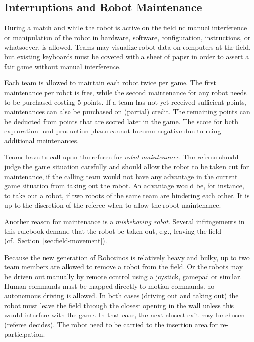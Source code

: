 \documentclass[12pt,twoside]{article}
\newcommand{\refsec}[1]{Section~\ref{#1}}
\begin{document}
\subsection{Interruptions and Robot Maintenance}
\label{sec:robot-maintenance}
During a match and while the robot is active on the field no manual
interference or manipulation of the robot in hardware, software,
configuration, instructions, or whatsoever, is allowed.  Teams may
visualize robot data on computers at the field, but existing keyboards
must be covered with a sheet of paper in order to assert a fair game
without manual interference.


Each team is allowed to maintain each robot twice per game. The first
maintenance per robot is free, while the second maintenance for any
robot needs to be purchased costing 5 points. If a team has not yet
received sufficient points, maintenances can also be purchased on
(partial) credit. The remaining points can be deducted from points
that are scored later in the game. The score for both exploration-
and production-phase cannot become negative due to using additional
maintenances.

Teams have to call upon the referee for \textit{robot maintenance}. The
referee should judge the game situation carefully and should allow the
robot to be taken out for maintenance, if the calling team would not
have any advantage in the current game situation from taking out the
robot. An advantage would be, for instance, to take out a robot, if
two robots of the same team are hindering each other. It is up to the
discretion of the referee when to allow the robot maintenance.

Another reason for maintenance is a \emph{misbehaving robot}. Several
infringements in this rulebook demand that the robot be taken out,
e.g., leaving the field (cf.~\refsec{sec:field-movement}).

Because the new generation of Robotinos is relatively heavy and bulky,
up to two team members are allowed to remove a robot from the field.
Or the robots may be driven out manually by remote control using a
joystick, gamepad or similar. Human commands must be mapped directly
to motion commands, no autonomous driving is allowed. In both cases
(driving out and taking out) the robot must leave the field through
the closest opening in the wall unless this would interfere with the
game. In that case, the next closest exit may be chosen (referee
decides). The robot need to be carried to the insertion area
for re-participation.
\end{document}
